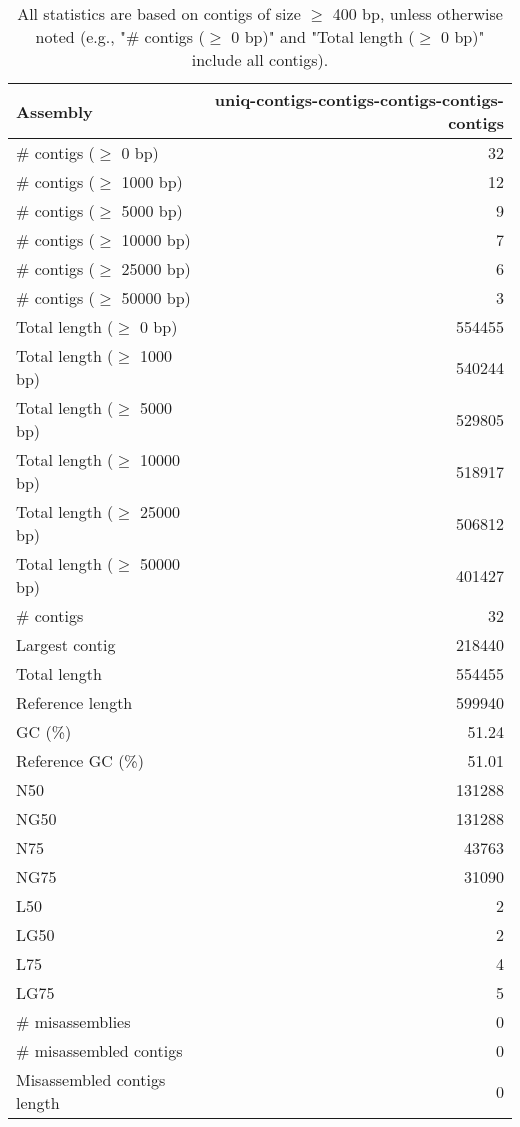 \documentclass[12pt,a4paper]{article}
\begin{document}
\begin{table}[ht]
\begin{center}
\caption{All statistics are based on contigs of size $\geq$ 400 bp, unless otherwise noted (e.g., "\# contigs ($\geq$ 0 bp)" and "Total length ($\geq$ 0 bp)" include all contigs).}
\begin{tabular}{|l*{1}{|r}|}
\hline
Assembly & uniq-contigs-contigs-contigs-contigs-contigs \\ \hline
\# contigs ($\geq$ 0 bp) & 32 \\ \hline
\# contigs ($\geq$ 1000 bp) & 12 \\ \hline
\# contigs ($\geq$ 5000 bp) & 9 \\ \hline
\# contigs ($\geq$ 10000 bp) & 7 \\ \hline
\# contigs ($\geq$ 25000 bp) & 6 \\ \hline
\# contigs ($\geq$ 50000 bp) & 3 \\ \hline
Total length ($\geq$ 0 bp) & 554455 \\ \hline
Total length ($\geq$ 1000 bp) & 540244 \\ \hline
Total length ($\geq$ 5000 bp) & 529805 \\ \hline
Total length ($\geq$ 10000 bp) & 518917 \\ \hline
Total length ($\geq$ 25000 bp) & 506812 \\ \hline
Total length ($\geq$ 50000 bp) & 401427 \\ \hline
\# contigs & 32 \\ \hline
Largest contig & 218440 \\ \hline
Total length & 554455 \\ \hline
Reference length & 599940 \\ \hline
GC (\%) & 51.24 \\ \hline
Reference GC (\%) & 51.01 \\ \hline
N50 & 131288 \\ \hline
NG50 & 131288 \\ \hline
N75 & 43763 \\ \hline
NG75 & 31090 \\ \hline
L50 & 2 \\ \hline
LG50 & 2 \\ \hline
L75 & 4 \\ \hline
LG75 & 5 \\ \hline
\# misassemblies & 0 \\ \hline
\# misassembled contigs & 0 \\ \hline
Misassembled contigs length & 0 \\ \hline

\end{tabular}
\end{center}
\end{table}
\end{document}
